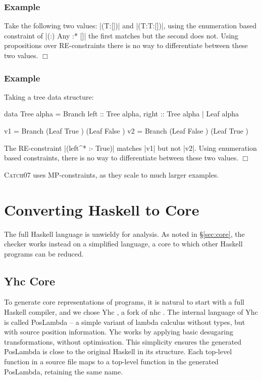 \documentclass[preprint]{sigplanconf}
\newcommand{\catch}{\textsc{Catch}}
\newcounter{exmp}
\newcommand{\yesexample}{\subsubsection*{Example \arabic{exmp}}\addtocounter{exmp}{1}}
\newcommand{\noexample}{\hfill$\Box$}
\newenvironment{example}{\yesexample}{\noexample}
\begin{document}
\begin{example}
Take the following two values: |(T:[])| and |(T:T:[])|, using the enumeration based constraint of |{(:) Any} :* {[]}| the first matches but the second does not. Using propositions over RE-constraints there is no way to differentiate between these two values.
\end{example}

\begin{example}
Taking a tree data structure:

\begin{code}
data Tree alpha  =  Branch {left :: Tree alpha, right :: Tree alpha}
                 |  Leaf alpha

v1 = Branch (Leaf True   ) (Leaf False  )
v2 = Branch (Leaf False  ) (Leaf True   )
\end{code}

The RE-constraint |(left^* :- True)| matches |v1| but not |v2|. Using enumeration based constraints, there is no way to differentiate between these two values.
\end{example}

\catch07 uses MP-constraints, as they scale to much larger examples.

\section{Converting Haskell to Core}
\label{sec:transform}

The full Haskell language is unwieldy for analysis. As noted in \S\ref{sec:core}, the checker works instead on a simplified language, a core to which other Haskell programs can be reduced.

\subsection{Yhc Core}

To generate core representations of programs, it is natural to start with a full Haskell compiler, and we chose Yhc \citep{Yhc}, a fork of nhc \citep{nhc}. The internal language of Yhc is called PosLambda -- a simple variant of lambda calculus without types, but with source position information. Yhc works by applying basic desugaring transformations, without optimisation. This simplicity ensures the generated PosLambda is close to the original Haskell in its structure. Each top-level function in a source file maps to a top-level function in the generated PosLambda, retaining the same name.
\end{document}
